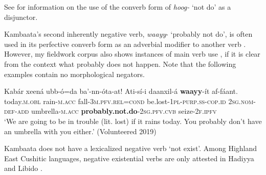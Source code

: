 \documentclass[output=paper,colorlinks,citecolor=brown,draftmode
]{langscibook}
\begin{document}

See  for information on the use of the converb form of \textit{hoog-} ‘not do’ as a disjunctor.

Kambaata’s second inherently negative verb, \textit{waayy}- ‘probably not do’, is often used in its perfective converb form as an adverbial modifier to another verb . However, my fieldwork corpus also shows instances of main verb use , if it is clear from the context what probably does not happen. Note that the following examples contain no morphological negators.

\ea\label{ex:treis:30}
\gll Kabár 			xeená 			ubb-ó=da	ba’-nn-óta-at! 							Ati-sí-i 					daanxil-á	\textbf{waayy}-ít 							af-fáant.\\
today.\textsc{m.obl}	rain-\textsc{m.acc}		fall-\textsc{3m.pfv.rel=cond} be.lost-\textsc{1pl-purp.ss-cop.id}		\textsc{2sg.nom-def-add}	umbrella-\textsc{m.acc} \textbf{probably.not.do}-\textsc{2sg.pfv.cvb} 	seize-\textsc{2f.ipfv}\\
\glt ‘We are going to be in trouble (lit. lost) if it rains today. You probably don’t have an umbrella with you either.’  (Volunteered 2019)
\z 


Kambaata does not have a lexicalized negative verb ‘not exist’. Among Highland East Cushitic languages, negative existential verbs are only attested in Ha\-diyya and Libido \citep[32]{Treis2012b}.
    
\end{document}
